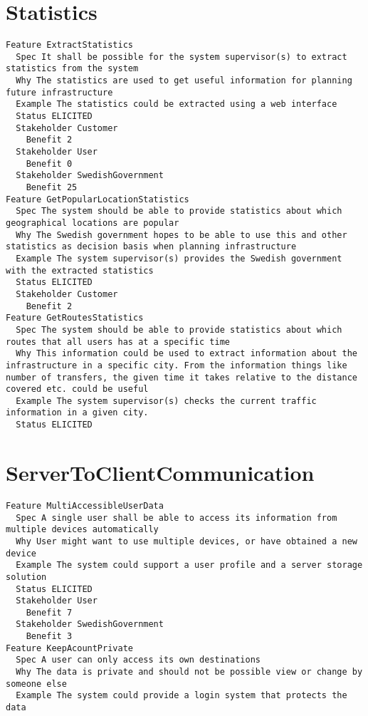 \begin{lstlisting}

\end{lstlisting}


       \section{Statistics}


\begin{lstlisting}
Feature ExtractStatistics
  Spec It shall be possible for the system supervisor(s) to extract statistics from the system
  Why The statistics are used to get useful information for planning future infrastructure
  Example The statistics could be extracted using a web interface
  Status ELICITED
  Stakeholder Customer
    Benefit 2
  Stakeholder User
    Benefit 0
  Stakeholder SwedishGovernment
    Benefit 25
Feature GetPopularLocationStatistics
  Spec The system should be able to provide statistics about which geographical locations are popular
  Why The Swedish government hopes to be able to use this and other statistics as decision basis when planning infrastructure
  Example The system supervisor(s) provides the Swedish government with the extracted statistics
  Status ELICITED
  Stakeholder Customer
    Benefit 2
Feature GetRoutesStatistics
  Spec The system should be able to provide statistics about which routes that all users has at a specific time
  Why This information could be used to extract information about the infrastructure in a specific city. From the information things like number of transfers, the given time it takes relative to the distance covered etc. could be useful
  Example The system supervisor(s) checks the current traffic information in a given city.
  Status ELICITED

\end{lstlisting}
    
        
       \section{ServerToClientCommunication}


\begin{lstlisting}
Feature MultiAccessibleUserData
  Spec A single user shall be able to access its information from multiple devices automatically
  Why User might want to use multiple devices, or have obtained a new device
  Example The system could support a user profile and a server storage solution
  Status ELICITED
  Stakeholder User
    Benefit 7
  Stakeholder SwedishGovernment
    Benefit 3
Feature KeepAcountPrivate
  Spec A user can only access its own destinations
  Why The data is private and should not be possible view or change by someone else
  Example The system could provide a login system that protects the data

\end{lstlisting}
    
